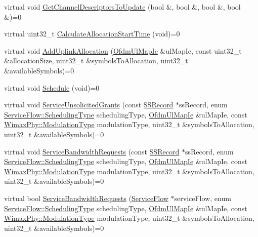 \begin{DoxyCompactItemize}
virtual void \hyperlink{classns3_1_1UplinkScheduler_ae500207af8583a3595da89edcc20b851}{Get\+Channel\+Descriptors\+To\+Update} (bool \&, bool \&, bool \&, bool \&)=0
\item 
virtual uint32\+\_\+t \hyperlink{classns3_1_1UplinkScheduler_a10d8a099202072dee74f879d9ae2479b}{Calculate\+Allocation\+Start\+Time} (void)=0
\item 
virtual void \hyperlink{classns3_1_1UplinkScheduler_a9bb05ef2a73f18c5004a812aefece8b6}{Add\+Uplink\+Allocation} (\hyperlink{classns3_1_1OfdmUlMapIe}{Ofdm\+Ul\+Map\+Ie} \&ul\+Map\+Ie, const uint32\+\_\+t \&allocation\+Size, uint32\+\_\+t \&symbols\+To\+Allocation, uint32\+\_\+t \&available\+Symbols)=0
\item 
virtual void \hyperlink{classns3_1_1UplinkScheduler_a36fc5c58146f1fb828f21f109cb1634c}{Schedule} (void)=0
\item 
virtual void \hyperlink{classns3_1_1UplinkScheduler_ab0fb68e0b8923cbec983dbcffbe7a63f}{Service\+Unsolicited\+Grants} (const \hyperlink{classns3_1_1SSRecord}{S\+S\+Record} $\ast$ss\+Record, enum \hyperlink{classns3_1_1ServiceFlow_a7990ba10be1e098328fd1e6382a26235}{Service\+Flow\+::\+Scheduling\+Type} scheduling\+Type, \hyperlink{classns3_1_1OfdmUlMapIe}{Ofdm\+Ul\+Map\+Ie} \&ul\+Map\+Ie, const \hyperlink{classns3_1_1WimaxPhy_a044c5d8a48ca992c39c2a946f6e755fa}{Wimax\+Phy\+::\+Modulation\+Type} modulation\+Type, uint32\+\_\+t \&symbols\+To\+Allocation, uint32\+\_\+t \&available\+Symbols)=0
\item 
virtual void \hyperlink{classns3_1_1UplinkScheduler_ae6bbcbf3cae55770d0f100692e8af16b}{Service\+Bandwidth\+Requests} (const \hyperlink{classns3_1_1SSRecord}{S\+S\+Record} $\ast$ss\+Record, enum \hyperlink{classns3_1_1ServiceFlow_a7990ba10be1e098328fd1e6382a26235}{Service\+Flow\+::\+Scheduling\+Type} scheduling\+Type, \hyperlink{classns3_1_1OfdmUlMapIe}{Ofdm\+Ul\+Map\+Ie} \&ul\+Map\+Ie, const \hyperlink{classns3_1_1WimaxPhy_a044c5d8a48ca992c39c2a946f6e755fa}{Wimax\+Phy\+::\+Modulation\+Type} modulation\+Type, uint32\+\_\+t \&symbols\+To\+Allocation, uint32\+\_\+t \&available\+Symbols)=0
\item 
virtual bool \hyperlink{classns3_1_1UplinkScheduler_a6e702b7f0bdb490a762b5e2b9b13c362}{Service\+Bandwidth\+Requests} (\hyperlink{classns3_1_1ServiceFlow}{Service\+Flow} $\ast$service\+Flow, enum \hyperlink{classns3_1_1ServiceFlow_a7990ba10be1e098328fd1e6382a26235}{Service\+Flow\+::\+Scheduling\+Type} scheduling\+Type, \hyperlink{classns3_1_1OfdmUlMapIe}{Ofdm\+Ul\+Map\+Ie} \&ul\+Map\+Ie, const \hyperlink{classns3_1_1WimaxPhy_a044c5d8a48ca992c39c2a946f6e755fa}{Wimax\+Phy\+::\+Modulation\+Type} modulation\+Type, uint32\+\_\+t \&symbols\+To\+Allocation, uint32\+\_\+t \&available\+Symbols)=0

\end{DoxyCompactItemize}
